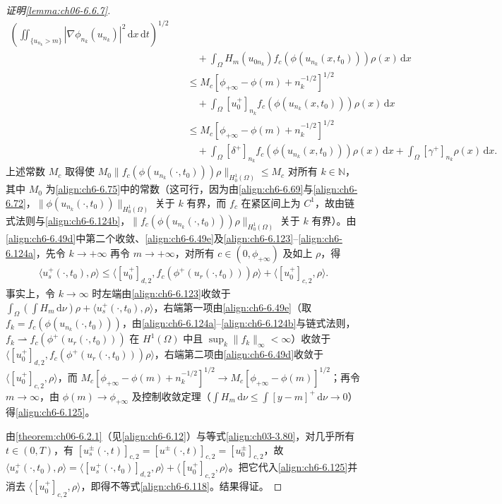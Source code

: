 \documentclass[../../main.tex]{subfiles}%
\begin{document}
\begin{proof}[证明\cref{lemma:ch06-6.6.7}]
\begin{align*}
\left(\iint_{\{u_{n_k}>m\}}|\nabla\phi_{n_k}(u_{n_k})|^2\,\mathrm{d}x\,\mathrm{d}t\right)^{1/2}\\
&\qquad+\int_\Omega H_m(u_{0n_k})f_c(\phi(u_{n_k}(x,t_0)))\rho(x)\,\mathrm{d}x\\
&\quad\leqslant M_c[\phi_{+\infty}-\phi(m)+n_k^{-1/2}]^{1/2}\\
&\qquad+\int_\Omega[u^+_0]_{n_k}f_c(\phi(u_{n_k}(x,t_0)))\rho(x)\,\mathrm{d}x\\
&\quad\leqslant M_c[\phi_{+\infty}-\phi(m)+n_k^{-1/2}]^{1/2}\\
&\qquad+\int_\Omega[\delta^+]_{n_k}f_c(\phi(u_{n_k}(x,t_0)))\rho(x)\,\mathrm{d}x
+\int_\Omega[\gamma^+]_{n_k}\rho(x)\,\mathrm{d}x.
\end{align*}
上述常数 $M_c$ 取得使 $M_0\|f_c(\phi(u_{n_k}(\cdot,t_0)))\rho\|_{H^1_0(\Omega)}\leqslant M_c$ 对所有 $k\in\mathbb{N}$，其中 $M_0$ 为\eqref{align:ch6-6.75}中的常数（这可行，因为由\eqref{align:ch6-6.69}与\eqref{align:ch6-6.72}，$\|\phi(u_{n_k}(\cdot,t_0))\|_{H^1_0(\Omega)}$ 关于 $k$ 有界，而 $f_c$ 在紧区间上为 $C^1$，故由链式法则与\eqref{align:ch6-6.124b}，$\|f_c(\phi(u_{n_k}(\cdot,t_0)))\rho\|_{H^1_0(\Omega)}$ 关于 $k$ 有界）。由\eqref{align:ch6-6.49d}中第二个收敛、\eqref{align:ch6-6.49e}及\eqref{align:ch6-6.123}--\eqref{align:ch6-6.124a}，先令 $k\to+\infty$ 再令 $m\to+\infty$，对所有 $c\in(0,\phi_{+\infty})$ 及如上 $\rho$，得
\begin{align}
\langle u^+_s(\cdot,t_0),\rho\rangle
\leqslant\langle[u^+_0]_{d,2},f_c(\phi^+(u_r(\cdot,t_0)))\rho\rangle
+\langle[u^+_0]_{c,2},\rho\rangle. \label{align:ch6-6.125}
\end{align}
事实上，令 $k\to\infty$ 时左端由\eqref{align:ch6-6.123}收敛于 $\int_\Omega(\int H_m\,\mathrm{d}\nu)\rho+\langle u^+_s(\cdot,t_0),\rho\rangle$，右端第一项由\eqref{align:ch6-6.49e}（取 $f_k=f_c(\phi(u_{n_k}(\cdot,t_0)))$，由\eqref{align:ch6-6.124a}--\eqref{align:ch6-6.124b}与链式法则，$f_k\rightharpoonup f_c(\phi^+(u_r(\cdot,t_0)))$ 在 $H^1(\Omega)$ 中且 $\sup_k\|f_k\|_\infty<\infty$）收敛于 $\langle[u^+_0]_{d,2},f_c(\phi^+(u_r(\cdot,t_0)))\rho\rangle$，右端第二项由\eqref{align:ch6-6.49d}收敛于 $\langle[u^+_0]_{c,2},\rho\rangle$，而 $M_c[\phi_{+\infty}-\phi(m)+n_k^{-1/2}]^{1/2}\to M_c[\phi_{+\infty}-\phi(m)]^{1/2}$；再令 $m\to\infty$，由 $\phi(m)\to\phi_{+\infty}$ 及控制收敛定理（$\int H_m\,\mathrm{d}\nu\leqslant\int[y-m]^+\,\mathrm{d}\nu\to0$）得\eqref{align:ch6-6.125}。

由\cref{theorem:ch06-6.2.1}（见\eqref{align:ch6-6.12}）与等式\eqref{align:ch03-3.80}，对几乎所有 $t\in(0,T)$，有 $[u^\pm_s(\cdot,t)]_{c,2}=[u^\pm(\cdot,t)]_{c,2}=[u^\pm_0]_{c,2}$，故 $\langle u^+_s(\cdot,t_0),\rho\rangle=\langle[u^+_s(\cdot,t_0)]_{d,2},\rho\rangle+\langle[u^+_0]_{c,2},\rho\rangle$。把它代入\eqref{align:ch6-6.125}并消去 $\langle[u^+_0]_{c,2},\rho\rangle$，即得不等式\eqref{align:ch6-6.118}。结果得证。
\end{proof}
\end{document}
